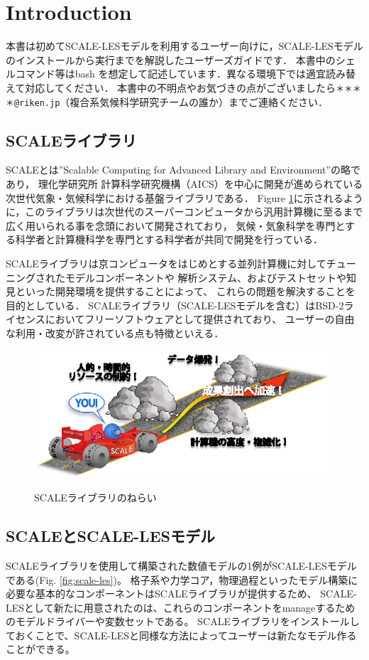 \section{Introduction}

本書は初めてSCALE-LESモデルを利用するユーザー向けに，SCALE-LESモデルのインストールから実行までを解説したユーザーズガイドです．
本書中のシェルコマンド等はbash を想定して記述しています．異なる環境下では適宜読み替えて対応してください．
本書中の不明点やお気づきの点がございましたら\verb|＊＊＊＊@riken.jp|（複合系気候科学研究チームの誰か）までご連絡ください．

\subsection{SCALEライブラリ}
SCALEとは''Scalable Computing for Advanced Library and Environment''の略であり，
理化学研究所 計算科学研究機構（AICS）を中心に開発が進められている次世代気象・気候科学における基盤ライブラリである．
Figure \ref{fig:scale}に示されるように，このライブラリは次世代のスーパーコンピュータから汎用計算機に至るまで広く用いられる事を念頭において開発されており，
気候・気象科学を専門とする科学者と計算機科学を専門とする科学者が共同で開発を行っている．

SCALEライブラリは京コンピュータをはじめとする並列計算機に対してチューニングされたモデルコンポーネントや
解析システム、およびテストセットや知見といった開発環境を提供することによって、
これらの問題を解決することを目的としている．
SCALEライブラリ（SCALE-LESモデルを含む）はBSD-2ライセンスにおいてフリーソフトウェアとして提供されており、
ユーザーの自由な利用・改変が許されている点も特徴といえる．

\begin{figure}[t]
\begin{center}
  \includegraphics[width=0.6\hsize]{./figure/library.eps}\\
  \caption{SCALEライブラリのねらい}
  \label{fig:scale}
\end{center}
\end{figure}


\subsection{SCALEとSCALE-LESモデル}
SCALEライブラリを使用して構築された数値モデルの1例がSCALE-LESモデルである(Fig. \ref{fig:scale-les})。
格子系や力学コア，物理過程といったモデル構築に必要な基本的なコンポーネントはSCALEライブラリが提供するため、
SCALE-LESとして新たに用意されたのは、これらのコンポーネントをmanageするためのモデルドライバーや変数セットである。
SCALEライブラリをインストールしておくことで、SCALE-LESと同様な方法によってユーザーは新たなモデル作ることができる。

